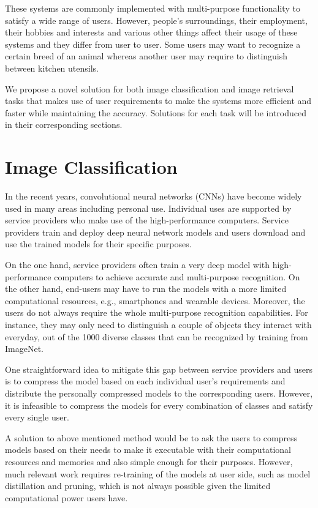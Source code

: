 These systems are commonly implemented with multi-purpose functionality to satisfy a wide range of users. 
However, people's surroundings, their employment, their hobbies and interests and various other things affect their usage of these systems 
and they differ from user to user.
Some users may want to recognize a certain breed of an animal 
whereas another user may require to distinguish between kitchen utensils.

We propose a novel solution for both image classification and image retrieval tasks 
that makes use of user requirements to make the systems more efficient and faster while maintaining the accuracy.
Solutions for each task will be introduced in their corresponding sections.



\section{Image Classification}
\label{sec:intro}

In the recent years, convolutional neural networks (CNNs) have become widely used in many areas including personal use. 
Individual uses are supported by service providers who make use of the high-performance computers. 
Service providers train and deploy deep neural network models and 
users download and use the trained models for their specific purposes.

On the one hand, service providers often train a very deep model with high-performance computers to achieve accurate and multi-purpose recognition. 
On the other hand, end-users may have to run the models with a more limited computational resources, e.g., smartphones and wearable devices. 
Moreover, the users do not always require the whole multi-purpose recognition capabilities. 
For instance, they may only need to distinguish a couple of objects they interact with everyday, out of the 1000 diverse classes that can be recognized by training from ImageNet\cite{deng2009imagenet}.

One straightforward idea to mitigate this gap between service providers and users is 
to compress the model based on each individual user's requirements and 
distribute the personally compressed models to the corresponding users. However, it is infeasible to compress the models for every combination of classes and satisfy every single user. 

A solution to above mentioned method would be to ask the users to compress models based on their needs to make it executable with their computational resources and memories and also simple enough for their purposes. 
However, much relevant work requires re-training of the models at user side, 
such as model distillation and pruning, 
which is not always possible given the limited computational power users have.


